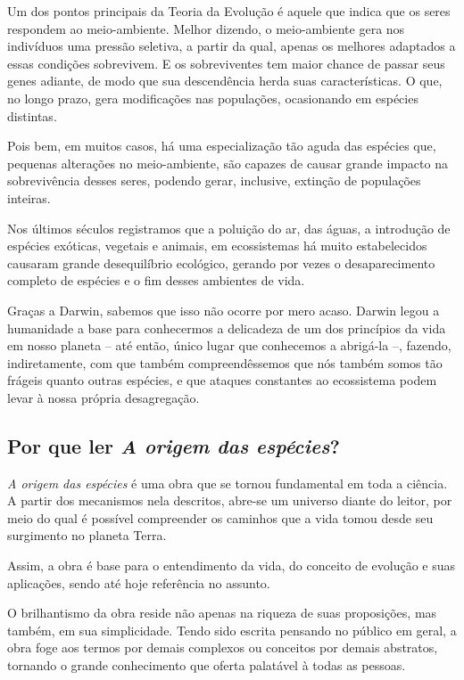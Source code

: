 \documentclass[11pt]{extarticle}
\begin{document}
Um dos pontos principais da Teoria da Evolução é aquele que indica que os seres
respondem ao meio-ambiente. Melhor dizendo, o meio-ambiente gera nos indivíduos
uma pressão seletiva, a partir da qual, apenas os melhores adaptados a essas
condições sobrevivem. E os sobreviventes tem maior chance de passar seus genes
adiante, de modo que sua descendência herda suas características. O que, no
longo prazo, gera modificações nas populações, ocasionando em espécies
distintas.

Pois bem, em muitos casos, há uma especialização tão aguda das espécies que,
pequenas alterações no meio-ambiente, são capazes de causar grande impacto na
sobrevivência desses seres, podendo gerar, inclusive, extinção de populações
inteiras.

Nos últimos séculos registramos que a poluição do ar, das águas, a introdução
de espécies exóticas, vegetais e animais, em ecossistemas há muito
estabelecidos causaram grande desequilíbrio ecológico, gerando por vezes
o desaparecimento completo de espécies e o fim desses ambientes de vida.

Graças a Darwin, sabemos que isso não ocorre por mero acaso. Darwin legou
a humanidade a base para conhecermos a delicadeza de um dos princípios da vida
em nosso planeta -- até então, único lugar que conhecemos a abrigá-la --,
fazendo, indiretamente, com que também compreendêssemos que nós também somos
tão frágeis quanto outras espécies, e que ataques constantes ao ecossistema
podem levar à nossa própria desagregação.

\subsection{Por que ler \emph{A origem das espécies}?}

\emph{A origem das espécies} é uma obra que se tornou fundamental em toda
a ciência. A partir dos mecanismos nela descritos, abre-se um universo diante
do leitor, por meio do qual é possível compreender os caminhos que a vida tomou
desde seu surgimento no planeta Terra.

Assim, a obra é base para o entendimento da vida, do conceito de evolução e suas
aplicações, sendo até hoje referência no assunto.

O brilhantismo da obra reside não apenas na riqueza de suas proposições, mas
também, em sua simplicidade. Tendo sido escrita pensando no público em geral,
a obra foge aos termos por demais complexos ou conceitos por demais abstratos,
tornando o grande conhecimento que oferta palatável à todas as pessoas.
\end{document}
